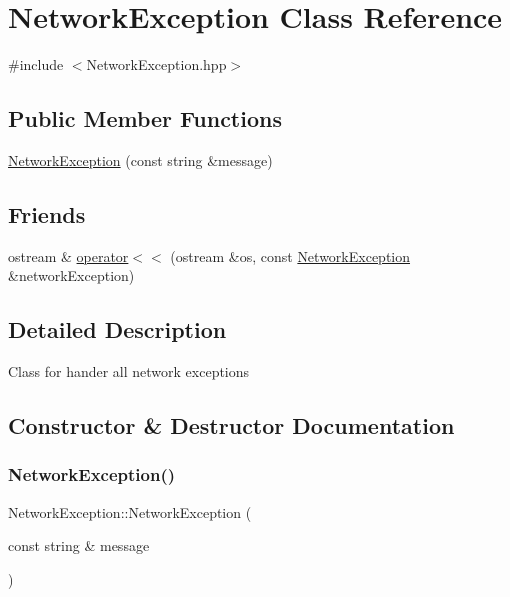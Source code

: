 \hypertarget{class_network_exception}{}\section{Network\+Exception Class Reference}
\label{class_network_exception}


{\ttfamily \#include $<$Network\+Exception.\+hpp$>$}

\subsection*{Public Member Functions}
\begin{DoxyCompactItemize}
\item 
\hyperlink{class_network_exception_a844beb53c862bdcacc263604baa44366}{Network\+Exception} (const string \&message)
\end{DoxyCompactItemize}
\subsection*{Friends}
\begin{DoxyCompactItemize}
\item 
ostream \& \hyperlink{class_network_exception_a2c376f88177b93b2c3734294358fbef0}{operator$<$$<$} (ostream \&os, const \hyperlink{class_network_exception}{Network\+Exception} \&network\+Exception)
\end{DoxyCompactItemize}


\subsection{Detailed Description}
Class for hander all network exceptions 

\subsection{Constructor \& Destructor Documentation}
\hypertarget{class_network_exception_a844beb53c862bdcacc263604baa44366}{}\label{class_network_exception_a844beb53c862bdcacc263604baa44366} 
\subsubsection{\texorpdfstring{Network\+Exception()}{NetworkException()}}
{\footnotesize\ttfamily Network\+Exception\+::\+Network\+Exception (\begin{DoxyParamCaption}\item[{const string \&}]{message }\end{DoxyParamCaption})}

